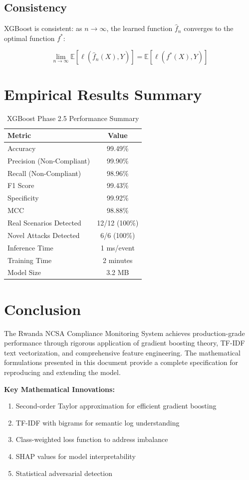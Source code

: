 \documentclass[12pt,a4paper]{article}
\begin{document}
\subsection{Consistency}

XGBoost is consistent: as $n \to \infty$, the learned function $\hat{f}_n$ converges to the optimal function $f^*$:

$$\lim_{n \to \infty} \mathbb{E}[\ell(\hat{f}_n(X), Y)] = \mathbb{E}[\ell(f^*(X), Y)]$$

\section{Empirical Results Summary}

\begin{table}[h]
\centering
\begin{tabular}{lc}
\toprule
\textbf{Metric} & \textbf{Value} \\
\midrule
Accuracy & 99.49\% \\
Precision (Non-Compliant) & 99.90\% \\
Recall (Non-Compliant) & 98.96\% \\
F1 Score & 99.43\% \\
Specificity & 99.92\% \\
MCC & 98.88\% \\
Real Scenarios Detected & 12/12 (100\%) \\
Novel Attacks Detected & 6/6 (100\%) \\
Inference Time & 1 ms/event \\
Training Time & 2 minutes \\
Model Size & 3.2 MB \\
\bottomrule
\end{tabular}
\caption{XGBoost Phase 2.5 Performance Summary}
\end{table}

\section{Conclusion}

The Rwanda NCSA Compliance Monitoring System achieves production-grade performance through rigorous application of gradient boosting theory, TF-IDF text vectorization, and comprehensive feature engineering. The mathematical formulations presented in this document provide a complete specification for reproducing and extending the model.

\textbf{Key Mathematical Innovations:}
\begin{enumerate}
    \item Second-order Taylor approximation for efficient gradient boosting
    \item TF-IDF with bigrams for semantic log understanding
    \item Class-weighted loss function to address imbalance
    \item SHAP values for model interpretability
    \item Statistical adversarial detection
\end{enumerate}
\end{document}
